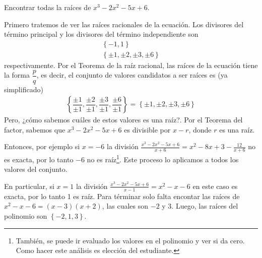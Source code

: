 \begin{section-example.tcb}
    Encontrar todas la raíces de $x^3 - 2x^2 - 5x + 6$.
\end{section-example.tcb}
\begin{solution}
    Primero tratemos de ver las raíces racionales de la ecuación.
    Los divisores del término principal y los divisores del término independiente son
    \begin{gather*}
        \left\{ -1, 1 \right\}\\
        \left\{ \pm 1, \pm 2, \pm 3, \pm6 \right\}
    \end{gather*}
    respectivamente.
    Por el Teorema de la raíz racional, las raíces de la ecuación tiene la forma $\dfrac{p}{q}$, es decir, el conjunto de valores candidatos a ser raíces es (ya simplificado)
    \begin{gather*}
        \left\{ \dfrac{\pm 1}{\pm 1}, \dfrac{\pm 2}{\pm 1}, \dfrac{\pm 3}{\pm 1}, \dfrac{\pm 6}{\pm 1} \right\} =
        \left\{ \pm 1, \pm 2, \pm 3, \pm 6 \right\}
    \end{gather*}
    Pero, ¿cómo sabemos cuáles de estos valores es una raíz?.
    Por el Teorema del factor, sabemos que $x^3 - 2x^2 - 5x + 6$ es divisible por $x - r$, donde $r$ es una raíz.

    Entonces, por ejemplo si $x = -6$ la división $\frac{x^3 - 2x^2 - 5x + 6}{x + 6} = x^2 - 8x + 3 - \frac{12}{x + 6}$ no es exacta, por lo tanto $-6$ no es raíz\footnote
    {También, se puede ir evaluado los valores en el polinomio y ver si da cero. Como hacer este análisis es elección del estudiante.}.
    Este proceso lo aplicamos a todos los valores del conjunto.

    En particular, si $x = 1$ la división $\frac{x^3 - 2x^2 - 5x + 6}{x - 1} = x^2 - x - 6$ en este caso es exacta, por lo tanto 1 es raíz.
    Para términar solo falta encontar las raíces de $x^2 - x - 6 = (x - 3)(x + 2)$, las cuales son $-2$ y 3.
    Luego, las raíces del polinomio son $\left\{ -2, 1, 3 \right\}$.
\end{solution}

